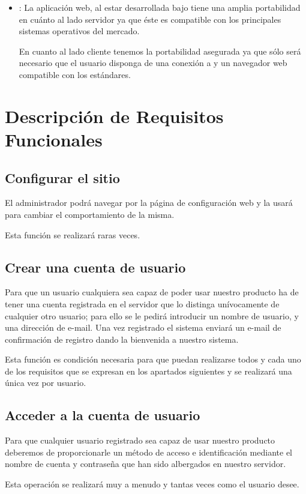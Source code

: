 \begin{itemize}
\item {}: La aplicación web, al estar desarrollada bajo
   tiene una amplia portabilidad en cuánto al lado
  servidor ya que éste es compatible con los principales sistemas operativos del
  mercado.

  En cuanto al lado cliente tenemos la portabilidad asegurada ya que sólo será
  necesario que el usuario disponga de una conexión a  y un
  navegador web compatible con los estándares.
\end{itemize}

\section{Descripción de Requisitos Funcionales}

\subsection*{Configurar el sitio}
El administrador podrá navegar por la página de configuración web y la usará
para cambiar el comportamiento de la misma.

Esta función se realizará raras veces.
\subsection*{Crear una cuenta de usuario}
Para que un usuario cualquiera sea capaz de poder usar nuestro producto ha de
tener una cuenta registrada en el servidor que lo distinga unívocamente de
cualquier otro usuario; para ello se le pedirá introducir un nombre de usuario,
y una dirección de e-mail. Una vez registrado el sistema enviará un e-mail de
confirmación de registro dando la bienvenida a nuestro sistema.

Esta función es condición necesaria para que puedan realizarse todos y cada uno
de los requisitos que se expresan en los apartados siguientes y se realizará una
única vez por usuario.

\subsection*{Acceder a la cuenta de usuario}
Para que cualquier usuario registrado sea capaz de usar nuestro producto
deberemos de proporcionarle un método de acceso e identificación mediante el
nombre de cuenta y contraseña que han sido albergados en nuestro servidor.

Esta operación se realizará muy a menudo y tantas veces como el usuario desee.
